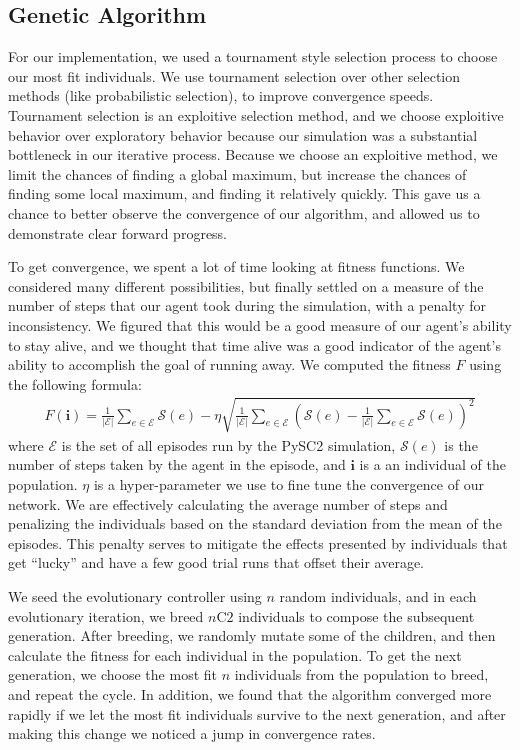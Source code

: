 \documentclass{article}
\begin{document}
\subsection{Genetic Algorithm}
For our implementation, we used a tournament style selection process to choose
our most fit individuals. We use tournament selection over other selection
methods (like probabilistic selection), to improve convergence speeds.
Tournament selection is an exploitive selection method, and we choose exploitive
behavior over exploratory behavior because our simulation was a substantial
bottleneck in our iterative process. Because we choose an exploitive method, we
limit the chances of finding a global maximum, but increase the chances of
finding some local maximum, and finding it relatively quickly. This gave us a
chance to better observe the convergence of our algorithm, and allowed us to
demonstrate clear forward progress.

To get convergence, we spent a lot of time looking at fitness functions. We
considered many different possibilities, but finally settled on a measure of the
number of steps that our agent took during the simulation, with a penalty for
inconsistency. We figured that this would be a good measure of our agent's
ability to stay alive, and we thought that time alive was a good indicator of
the agent's ability to accomplish the goal of running away. We computed the
fitness $F$ using the following formula:
\begin{align}\label{eq:fitness}
  F(\bm{i}) = \frac{1}{|\bm{\mathcal{E}}|} \sum_{e
\in \bm{\mathcal{E}}} \mathcal{S}(e) - \eta\sqrt{\frac{1}{|\bm{\mathcal{E}}|}
\sum_{e \in \bm{\mathcal{E}}}\left(\mathcal{S}(e) - \frac{1}{|\bm{\mathcal{E}}|}
\sum_{e \in \bm{\mathcal{E}}} \mathcal{S}(e)\right)^2}
\end{align}
where $\bm{\mathcal{E}}$ is the set of all episodes run by the PySC2
simulation, $\mathcal{S}(e)$ is the number of steps taken by the agent in the
episode, and $\bm{i}$ is a an individual of the population. $\eta$ is a
hyper-parameter we use to fine tune the convergence of our network. We are
effectively calculating the average number of steps and penalizing the
individuals based on the standard deviation from the mean of the episodes. This
penalty serves to mitigate the effects presented by individuals that get
``lucky'' and have a few good trial runs that offset their average.

We seed the evolutionary controller using $n$ random individuals, and in each
evolutionary iteration, we breed $n\text{C}2$ individuals to compose the
subsequent generation. After breeding, we randomly mutate some of the children,
and then calculate the fitness for each individual in the population. To get the
next generation, we choose the most fit $n$ individuals from the population to
breed, and repeat the cycle. In addition, we found that the algorithm converged
more rapidly if we let the most fit individuals survive to the next generation,
and after making this change we noticed a jump in convergence rates.
\end{document}
